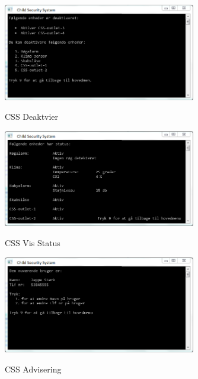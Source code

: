 \begin{figure}[h] \centering
{\includegraphics[width=0.75\textwidth]{billeder/cmdprompt/CSS_deaktiver}}
\caption{CSS Deaktvier}
\end{figure}

\begin{figure}[h] \centering
{\includegraphics[width=0.75\textwidth]{billeder/cmdprompt/CSS_vis_status}}
\caption{CSS Vis Status}
\end{figure}

\begin{figure}[h] \centering
{\includegraphics[width=0.75\textwidth]{billeder/cmdprompt/CSS_advisering}}
\caption{CSS Advisering}
\end{figure}



